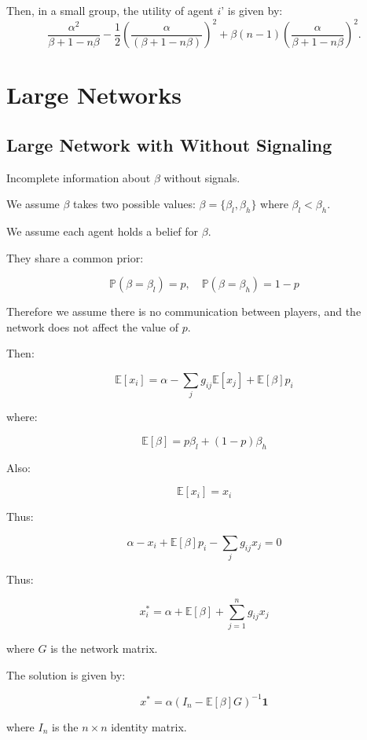 \documentclass[12pt]{article}
\begin{document}
Then, in a small group, the utility of agent $i$' is given by:
\[
\frac{\alpha^2}{\beta + 1 - n\beta} - \frac{1}{2} \left( \frac{\alpha}{(\beta + 1 - n\beta)} \right)^2 + \beta(n - 1) \left( \frac{\alpha}{\beta + 1 - n\beta} \right)^2. \tag{4}
\]


\section{Large Networks}
\subsection{Large Network with Without Signaling}

Incomplete information about $\beta$ without signals.

We assume $\beta$ takes two possible values: $\beta = \{\beta_l,\beta_h\}$ where $\beta_l < \beta_h$. 

We assume each agent holds a belief for $\beta$.

They share a common prior:

\[
\mathbb{P}(\beta = \beta_l) = p, \quad \mathbb{P}(\beta = \beta_h) = 1-p
\]

Therefore we assume there is no communication between players, and the network does not affect the value of $p$.

Then:

\[
\mathbb{E}[x_i] = \alpha - \sum_{j} g_{ij} \mathbb{E}[x_j] + \mathbb{E}[\beta] p_i
\]

where:

\[
\mathbb{E}[\beta] = p \beta_l + (1-p) \beta_h
\]

Also:

\[
\mathbb{E}[x_i] = x_i
\]

Thus:

\[
\alpha - x_i + \mathbb{E}[\beta] p_i - \sum_{j} g_{ij} x_j = 0
\]

\vspace{1em}

Thus:

\[
x_i^* = \alpha + \mathbb{E}[\beta] + \sum_{j=1}^{n} g_{ij} x_j
\]

where $G$ is the network matrix.

\vspace{1em}

The solution is given by:

\[
x^* = \alpha (I_n - \mathbb{E}[\beta] G)^{-1} \mathbf{1}
\]

where $I_n$ is the $n \times n$ identity matrix.
\end{document}
